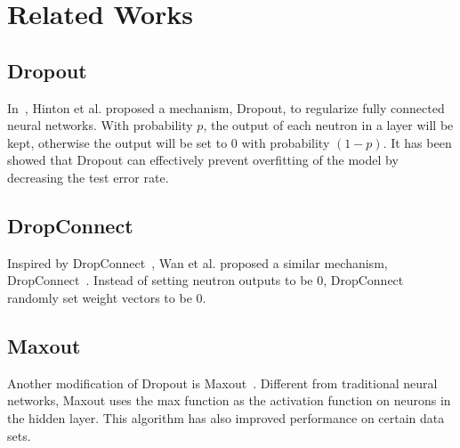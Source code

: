 \section{Related Works}
\label{sec:related}

\subsection{Dropout}
In~\cite{hinton2012improving}, Hinton et al. proposed a mechanism,
Dropout, to regularize fully connected neural networks.
With probability $p$, the output of each neutron in a layer will be kept,
otherwise the output will be set to $0$ with probability $(1-p)$.
It has been showed that Dropout can effectively prevent overfitting of
the model by decreasing the test error rate.

\subsection{DropConnect}
Inspired by DropConnect~\cite{hinton2012improving}, Wan et al. proposed
a similar mechanism, DropConnect~\cite{wan2013dropconnect}.
Instead of setting neutron outputs to be $0$, DropConnect randomly set
weight vectors to be $0$.

\subsection{Maxout}
Another modification of Dropout is Maxout~\cite{goodfellow13maxout}.
Different from traditional neural networks, Maxout uses the max function as
the activation function on neurons in the hidden layer.
This algorithm has also improved performance on certain data sets.
